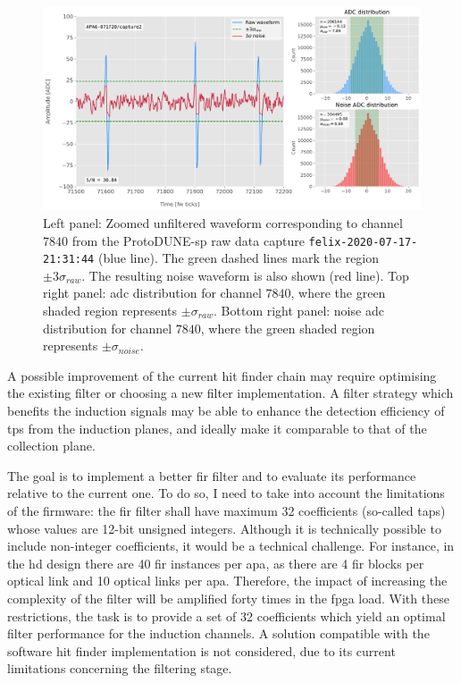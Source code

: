 \begin{figure}[t]
	\centering
	\includegraphics[width=1\linewidth]{Images/Matched_Filter/waveform_example_raw}
	\caption[Example unfiltered waveform from a ProtoDUNE-\gls{sp} raw data capture.]{Left panel: Zoomed unfiltered waveform corresponding to channel $7840$ from the ProtoDUNE-\gls{sp} raw data capture \texttt{felix-2020-07-17-21:31:44} (blue line). The green dashed lines mark the region $\pm3\sigma_{raw}$. The resulting noise waveform is also shown (red line). Top right panel: \gls{adc} distribution for channel $7840$, where the green shaded region represents $\pm \sigma_{raw}$. Bottom right panel: noise \gls{adc} distribution for channel $7840$, where the green shaded region represents $\pm \sigma_{noise}$.}
	\label{fig:adcs_nofir}
\end{figure}

A possible improvement of the current hit finder chain may require optimising the existing filter or choosing a new filter implementation. A filter strategy which benefits the induction signals may be able to enhance the detection efficiency of \gls{tp}s from the induction planes, and ideally make it comparable to that of the collection plane.  

The goal is to implement a better \gls{fir} filter and to evaluate its performance relative to the current one. To do so, I need to take into account the limitations of the firmware: the \gls{fir} filter shall have maximum 32 coefficients (so-called taps) whose values are 12-bit unsigned integers. Although it is technically possible to include non-integer coefficients, it would be a technical challenge. For instance, in the \gls{hd} design there are 40 \gls{fir} instances per \gls{apa}, as there are 4 \gls{fir} blocks per optical link and 10 optical links per \gls{apa}. Therefore, the impact of increasing the complexity of the filter will be amplified forty times in the \gls{fpga} load. With these restrictions, the task is to provide a set of 32 coefficients which yield an optimal filter performance for the induction channels. A solution compatible with the software hit finder implementation is not considered, due to its current limitations concerning the filtering stage.

